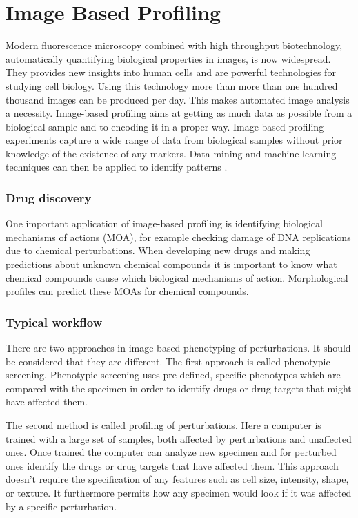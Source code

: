 \chapter{Image Based Profiling}

Modern fluorescence microscopy combined with high throughput biotechnology, automatically quantifying biological properties in images, is now widespread. They provides new insights into human cells and are powerful technologies for studying cell biology. 
Using this technology more than more than 
one hundred thousand  images can be produced per day.
This makes automated image analysis a necessity. 
Image-based profiling aims at getting as much data 
as possible from a biological sample and to encoding
it in a proper way. Image-based profiling experiments capture a wide range of data
from biological samples without prior knowledge
of the existence of any markers.
Data mining and machine learning techniques can then be applied to identify patterns \cite{Jones} \cite{Scheeder2018}.

\subsection{Drug discovery}

One important application of image-based profiling is identifying biological mechanisms of actions (MOA),
for example checking damage of DNA replications due to chemical perturbations.
When developing new drugs and making predictions about unknown
chemical compounds it is important to know what chemical compounds cause which biological mechanisms of action.
Morphological profiles can predict these MOAs for chemical compounds.

\subsection{Typical workflow}

There are two approaches in image-based phenotyping of perturbations. 
It should be considered that they are different.
The first approach is called phenotypic screening. 
Phenotypic screening uses pre-defined, specific phenotypes which are compared 
with the specimen in order to identify drugs or drug targets that might have affected 
them.

The second method is called profiling of perturbations. 
Here a computer is trained with a large set of samples, both
affected by perturbations and unaffected ones.
Once trained the computer can analyze new specimen 
and for perturbed ones identify the drugs or drug targets that have affected them.
This approach doesn't require the specification of any features such as cell size, intensity, shape, or texture.
It furthermore permits how any specimen would look if it was affected by a specific perturbation.



